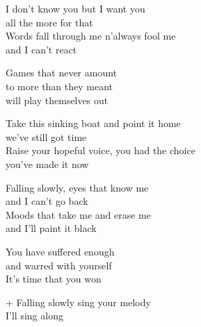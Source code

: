 
\ve{}
I don't know you but I want you\\
all the more for that\\
Words fall through me n'always fool me\\
and I can't react 

Games that never amount\\
to more than they meant\\
will play themselves out

\cho{}
Take this sinking boat and point it home\\
we've still got time\\
Raise your hopeful voice, you had the choice\\
you've made it now 

\ve{}
Falling slowly, eyes that know me\\
and I can't go back\\
Moods that take me and erase me\\
and I'll paint it black

You have suffered enough\\
and warred with yourself\\
It's time that you won

\cho{}
+ Falling slowly sing your melody\\
I'll sing along 

\esong{}